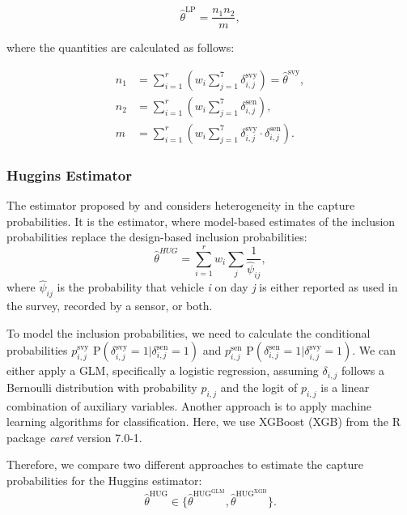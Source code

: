 \documentclass[12pt, a4paper]{article}
\begin{document}
$$\hat{\theta}^{\text{LP}} = \frac{n_{1}n_{2}}{m},$$

\noindent where the quantities are calculated as follows:

$$
\begin{aligned}
n_{1} &= \sum_{i=1}^{r} \left(w_{i} \sum_{j=1}^{7} \delta_{i,j}^{\text{svy}} \right) = \hat{\theta}^{\text{svy}}, \\
n_{2} &= \sum_{i=1}^{r} \left(w_{i} \sum_{j=1}^{7} \delta_{i,j}^{\text{sen}} \right), \\
m &= \sum_{i=1}^{r} \left(w_{i} \sum_{j=1}^{7} \delta_{i,j}^{\text{svy}} \cdot \delta_{i,j}^{\text{sen}} \right).
\end{aligned}
$$

\subsubsection*{Huggins Estimator}
\noindent The estimator proposed by \textcite{huggins1989statistical} and \textcite{alho1990logistic} considers heterogeneity in the capture probabilities. It is the \textcite{horvitz1952generalization} estimator, where model-based estimates of the inclusion probabilities replace the design-based inclusion probabilities:
$$\hat\theta^{HUG} = \sum_{i=1}^r w_i \sum_{j}\frac{1}{\hat\psi_{ij}},$$
\noindent where $\hat\psi_{ij}$ is the probability that vehicle \textit{i} on day \textit{j} is either reported as used in the survey, recorded by a sensor, or both. \par
To model the inclusion probabilities, we need to calculate the conditional probabilities $p_{i,j}^{\text{svy}}$ $\text{P}(\delta_{i,j}^{\text{svy}} = 1|\delta_{i,j}^{\text{sen}} = 1)$ and $p_{i,j}^{\text{sen}} $ $\text{P}(\delta_{i,j}^{\text{sen}} = 1|\delta_{i,j}^{\text{svy}} = 1)$. We can either apply a GLM, specifically a logistic regression, assuming $\delta_{i,j}$ follows a Bernoulli distribution with probability $p_{i,j}$ and the logit of $p_{i,j}$ is a linear combination of auxiliary variables. Another approach is to apply machine learning algorithms for classification. Here, we use XGBoost (XGB) from the R package \textit{caret} version 7.0-1.\par
Therefore, we compare two different approaches to estimate the capture probabilities for the Huggins estimator: 
$$\hat\theta^{\text{HUG}} \in \{\hat\theta^{\text{HUG}^{\text{GLM}}}, \hat\theta^{\text{HUG}^{\text{XGB}}} \}.$$
\end{document}
